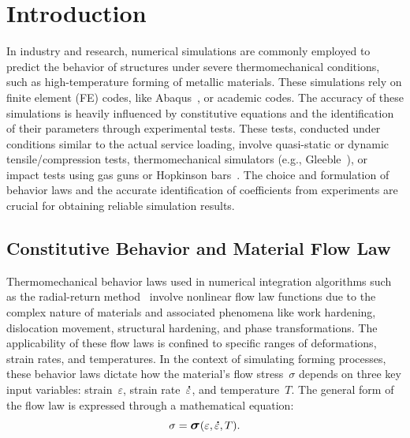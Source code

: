 \documentclass[algorithms,article,accept,pdftex,oneauthor]{Definitions/mdpi}
\DeclareRobustCommand{\mdot}[1]{\accentset{\mbox{\bfseries .}}{#1}}
\DeclareRobustCommand{\Sig}{\mbox{\large\ensuremath{\boldsymbol{\sigma}}}}
\begin{document}
\section{Introduction}\label{sec:Introduction}

In industry and research, numerical simulations are commonly employed to predict the behavior of structures under severe thermomechanical conditions, such as high-temperature forming of metallic materials.
These simulations rely on finite element (FE) codes, like Abaqus~\cite{Abaqus}, or academic codes.
The accuracy of these simulations is heavily influenced by constitutive equations and the identification of their parameters through experimental tests.
These tests, conducted under conditions similar to the actual service loading, involve quasi-static or dynamic tensile/compression tests, thermomechanical simulators (e.g., Gleeble~\cite{Lin-2009-MFS, Bennett-2010-C, Kumar-2016-TMS, Yu-2019-RCR}), or impact tests using gas guns or Hopkinson bars~\cite{Kolsky-1949-IMP}.
The choice and formulation of behavior laws and the accurate identification of coefficients from experiments are crucial for obtaining reliable simulation results.

\subsection{Constitutive Behavior and Material Flow Law}\label{subsec:ConstBehavior}

Thermomechanical behavior laws used in numerical integration algorithms such as the radial-return method~\cite{Ponthot-2002-USU} involve nonlinear flow law functions due to the complex nature of materials and associated phenomena like work hardening, dislocation movement, structural hardening, and phase transformations.
The applicability of these flow laws is confined to specific ranges of deformations, strain rates, and temperatures.
In the context of simulating forming processes, these behavior laws dictate how the material's flow stress~$\sigma$ depends on three key input variables: strain~$\varepsilon$, strain rate~$\mdot{\varepsilon}$, and temperature~$T$.
The general form of the flow law is expressed through a mathematical equation: %
\begin{equation}
\sigma = \Sig\left(\varepsilon, \mdot{\varepsilon}, T\right).\label{eq:GenFlow}
\end{equation}
\end{document}

